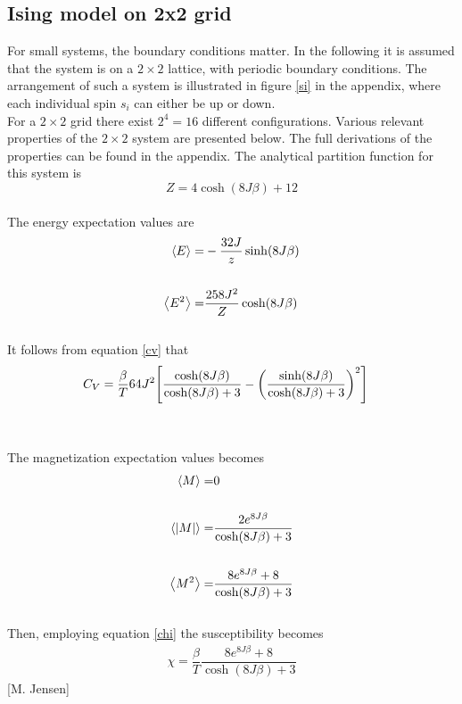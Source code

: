 \documentclass[%
reprint,nofootinbib,
amsmath,amssymb,
aps,
]{revtex4-1}
\begin{document}
\subsection*{Ising model on 2x2 grid} \noindent 
For small systems, the boundary conditions matter. In the following it is assumed that the system is on a $2\times2$ lattice, with periodic boundary conditions. The arrangement of such a system is illustrated in figure \ref{si} in the appendix, where each individual spin $s_i$ can either be up or down. \\ \indent 
For a $2\times 2$ grid there exist $2^4 = 16$ different configurations. Various relevant properties of the $2\times 2$ system are presented below. The full derivations of the properties can be found in the appendix. The analytical partition function for this system is \\ 
\begin{equation} 
	Z =  4\cosh(8J\beta) + 12 
\end{equation} \\
The energy expectation values are \vspace{1mm} \\ 
\begin{align}\label{E}
	\expval{E} =& -\dfrac{32J}{z}\sinh(8J\beta) \\ &\nonumber\\
	\expval{E^2} =& \dfrac{258J^2}{Z}\cosh(8J\beta)
\end{align}\vspace{1mm} \\ 
It follows from equation \ref{cv} that \vspace{1mm} \\ 
\begin{align} \label{CV}
	C_V= \dfrac{\beta}{T}64J^2\qty[\dfrac{\cosh(8J\beta)}{\cosh(8J\beta) + 3}  -\qty(\dfrac{\sinh(8J\beta)}{\cosh(8J\beta) + 3 })^2]\nonumber  \\&\nonumber \\
\end{align}\vspace{1mm} \\ 
The magnetization expectation values becomes \vspace{1mm} \\ 
\begin{align} \label{exM}
	\expval{M} =&  0 \\ &\nonumber\\
\expval{\abs{M}} =&  \dfrac{2e^{8J\beta}}{\cosh(8J\beta) + 3 }\\ &\nonumber\\
\expval{M^2} =& \dfrac{8e^{8J\beta} + 8}{\cosh(8J\beta) + 3}
\end{align} \vspace{2mm}\\ 
Then, employing equation \ref{chi} the susceptibility becomes \vspace{1mm} \\ 
\begin{align}\label{CHI}
	\chi = \dfrac{\beta}{T}\dfrac{8e^{8J\beta} + 8}{\cosh(8J\beta) + 3}
\end{align}
\hspace{6.9cm}[M. Jensen]
\end{document}
